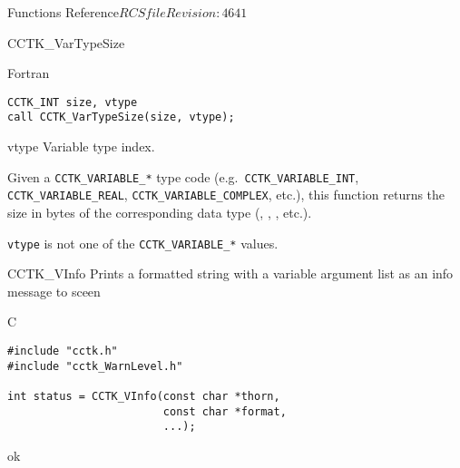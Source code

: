 \begin{cactuspart}{ Functions Reference}{$RCSfile$}{$Revision: 4641 $}
\begin{FunctionDescription}{CCTK\_VarTypeSize}
\begin{SynopsisSection}
\begin{Synopsis}{Fortran}
\begin{verbatim}
CCTK_INT size, vtype
call CCTK_VarTypeSize(size, vtype);
\end{verbatim}
\end{Synopsis}
\end{SynopsisSection}

\begin{ParameterSection}
\begin{Parameter}{vtype}
Variable type index.
\end{Parameter}
\end{ParameterSection}

\begin{Discussion}
Given a \verb|CCTK_VARIABLE_*| type code (e.g.~\verb|CCTK_VARIABLE_INT|,
\verb|CCTK_VARIABLE_REAL|, \verb|CCTK_VARIABLE_COMPLEX|, etc.), this
function returns the size in bytes of the corresponding data type
(, , , etc.).
\end{Discussion}

\begin{ErrorSection}
\begin{Error}{-1}
\verb|vtype| is not one of the \verb|CCTK_VARIABLE_*| values.
\end{Error}
\end{ErrorSection}
\end{FunctionDescription}


\begin{FunctionDescription}{CCTK\_VInfo}
\label{CCTK-VInfo}
Prints a formatted string with a variable argument list as an info message
to sceen

\begin{SynopsisSection}
\begin{Synopsis}{C}
\begin{verbatim}
#include "cctk.h"
#include "cctk_WarnLevel.h"

int status = CCTK_VInfo(const char *thorn,
                        const char *format,
                        ...);
\end{verbatim}
\end{Synopsis}
\end{SynopsisSection}

\begin{ResultSection}
\begin{Result}{0} ok \end{Result}
\end{ResultSection}


\end{FunctionDescription}
\end{cactuspart}
